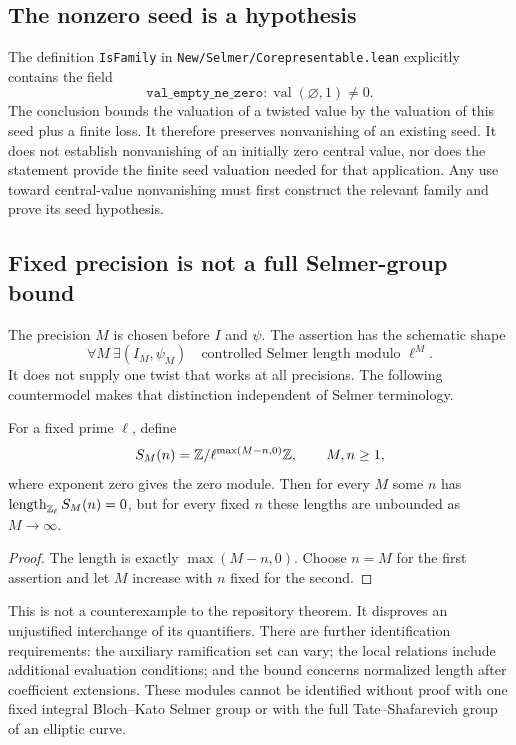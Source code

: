 \subsection{The nonzero seed is a hypothesis}

The definition \texttt{IsFamily} in
\texttt{New/Selmer/Corepresentable.lean} explicitly contains the field
\[
 \texttt{val\_empty\_ne\_zero}:
       \operatorname{val}(\varnothing,1)\ne0.
\]
The conclusion bounds the valuation of a twisted value by the
valuation of this seed plus a finite loss. It therefore preserves
nonvanishing of an existing seed. It does not establish nonvanishing
of an initially zero central value, nor does the statement provide
the finite seed valuation needed for that application. Any use toward
central-value nonvanishing must first construct the relevant family
and prove its seed hypothesis.

\subsection{Fixed precision is not a full Selmer-group bound}

The precision $M$ is chosen before $I$ and $\psi$. The assertion has
the schematic shape
\[
 \forall M\ \exists(I_M,\psi_M)\quad
       \text{controlled Selmer length modulo }\ell^M.
\]
It does not supply one twist that works at all precisions. The following
countermodel makes that distinction independent of Selmer terminology.

\begin{proposition}\label{prop:selmer-quantifiers}
For a fixed prime $\ell$, define
\[
 S_M(n)=\mathbb Z/\ell^{\max(M-n,0)}\mathbb Z,
 \qquad M,n\geq1,
\]
where exponent zero gives the zero module. Then for every $M$ some
$n$ has $\operatorname{length}_{\mathbb Z_\ell} S_M(n)=0$, but for every
fixed $n$ these lengths are unbounded as $M\to\infty$.
\end{proposition}

\begin{proof}
The length is exactly $\max(M-n,0)$. Choose $n=M$ for the first
assertion and let $M$ increase with $n$ fixed for the second.
\end{proof}

This is not a counterexample to the repository theorem. It disproves
an unjustified interchange of its quantifiers. There are further
identification requirements: the auxiliary ramification set can vary;
the local relations include additional evaluation conditions; and
the bound concerns normalized length after coefficient extensions.
These modules cannot be identified without proof with one fixed
integral Bloch--Kato Selmer group or with the full
Tate--Shafarevich group of an elliptic curve.

